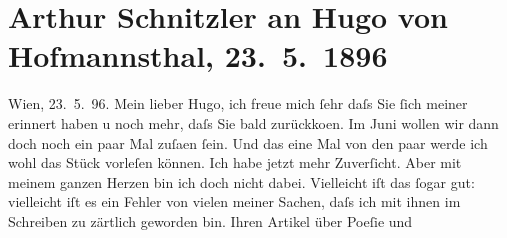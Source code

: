 

         
         \renewcommand{\erwaehntePersonen}{Personen: Richard Beer-Hofmann, Otto Brahm, Johann Wolfgang von Goethe, Friedrich Hebbel, Hugo von Hofmannsthal, Gotthold Ephraim Lessing, Felix Salten, Gustav Schwarzkopf, Hippolyte Taine}
         \renewcommand{\erwaehnteOrte}{Orte: Dänemark, Norwegen, Schweden, Tlumatsch, Wien}
         \renewcommand{\erwaehnteWerke}{Werke: ?? [Englischer Kriminalroman], Der Zerrissene, Die Frau des Weisen. Erzählung, Die Revolution, Freiwild. Schauspiel in 3 Akten, Ollapatrida des durchgetriebenen Fuchsmundi, Poesie und Leben. Aus einem Vortrage, West-östlicher Divan}
               \section[Arthur Schnitzler an Hugo von Hofmannsthal, 23. 5. 1896]{ Arthur Schnitzler an Hugo von Hofmannsthal, 23. 5. 1896}\nopagebreak{}\rehead{ }\begin{ledgroupsized}[t]{13cm}\normalsize\beginnumbering \toendnotes[C]{\smallbreak\pagebreak[2]} 
\toendnotes[C]{\smallbreak}\pstart
           \raggedleft{}{\pb}Wien, 23. 5. 96.\pend
           \pstart
           Mein lieber Hugo, ich freue mich ſehr daſs Sie ſich meiner erinnert
               haben u noch mehr, daſs Sie bald zurückko{\geminationm}en. Im
                  Juni wollen wir dann doch noch ein paar Mal zuſa{\geminationm}en ſein. Und das eine Mal von den paar werde ich wohl
               das Stück vorleſen können. Ich
               habe jetzt mehr Zuverſicht. Aber mit meinem ganzen Herzen bin ich doch nicht dabei.
               Vielleicht iſt das ſogar gut: vielleicht {\pb}iſt es ein
               Fehler von vielen meiner Sachen, daſs ich mit ihnen im Schreiben zu zärtlich geworden
               bin.\pend
           \pstart
           Ihren Artikel über Poeſie und

\end{ledgroupsized}
